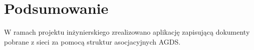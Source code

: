 \chapter{Podsumowanie}
\label{cha:podsumowanie}

W ramach projektu inżynierskiego zrealizowano aplikację zapisującą dokumenty pobrane z sieci za pomocą struktur asocjacyjnych AGDS.
